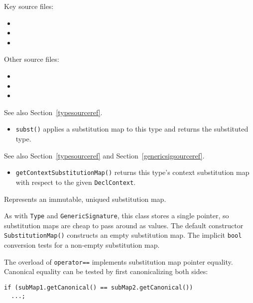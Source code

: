 \documentclass[../generics]{subfiles}
\begin{document}
Key source files:
\begin{itemize}
\item {}
\item {}
\item {}
\end{itemize}
Other source files:
\begin{itemize}
\item {}
\item {}
\item {}
\end{itemize}

See also Section~\ref{typesourceref}.
\begin{itemize}
\item \texttt{subst()} applies a substitution map to this type and returns the substituted type.
\end{itemize}

See also Section~\ref{typesourceref} and Section~\ref{genericsigsourceref}.
\begin{itemize}
\item \texttt{getContextSubstitutionMap()} returns this type's context substitution map with respect to the given \texttt{DeclContext}.
\end{itemize}

Represents an immutable, uniqued substitution map.

As with \texttt{Type} and \texttt{GenericSignature}, this class stores a single pointer, so substitution maps are cheap to pass around as values. The default constructor \texttt{SubstitutionMap()} constructs an empty substitution map. The implicit \texttt{bool} conversion tests for a non-empty substitution map.

The overload of \texttt{operator==} implements substitution map pointer equality. Canonical equality can be tested by first canonicalizing both sides:
\begin{Verbatim}
if (subMap1.getCanonical() == subMap2.getCanonical())
  ...;
\end{Verbatim}
\end{document}
